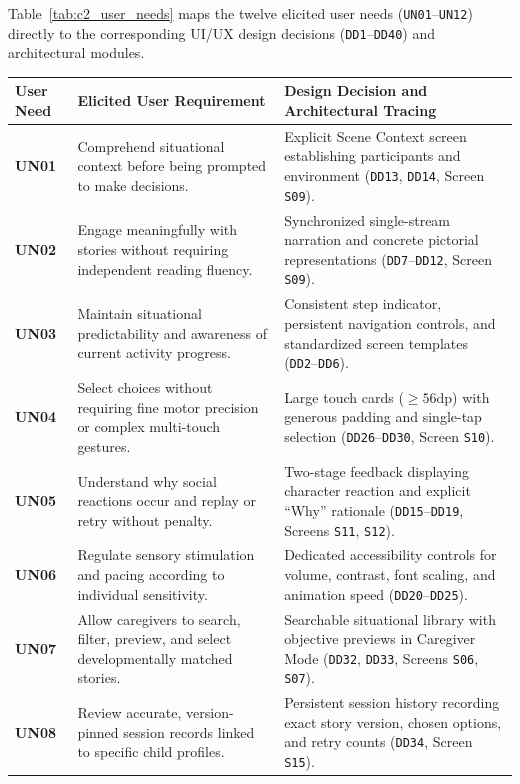 Table~\ref{tab:c2_user_needs} maps the twelve elicited user needs (\texttt{UN01}--\texttt{UN12}) directly to the corresponding UI/UX design decisions (\texttt{DD1}--\texttt{DD40}) and architectural modules.

\begin{xltabular}{\textwidth}{|p{1.8cm}|p{4.5cm}|X|}
\hline
\textbf{User Need} & \textbf{Elicited User Requirement} & \textbf{Design Decision and Architectural Tracing} \\ \hline
\endhead
\textbf{UN01} & Comprehend situational context before being prompted to make decisions. & Explicit Scene Context screen establishing participants and environment (\texttt{DD13}, \texttt{DD14}, Screen \texttt{S09}). \\ \hline
\textbf{UN02} & Engage meaningfully with stories without requiring independent reading fluency. & Synchronized single-stream narration and concrete pictorial representations (\texttt{DD7}--\texttt{DD12}, Screen \texttt{S09}). \\ \hline
\textbf{UN03} & Maintain situational predictability and awareness of current activity progress. & Consistent step indicator, persistent navigation controls, and standardized screen templates (\texttt{DD2}--\texttt{DD6}). \\ \hline
\textbf{UN04} & Select choices without requiring fine motor precision or complex multi-touch gestures. & Large touch cards ($\ge 56\text{dp}$) with generous padding and single-tap selection (\texttt{DD26}--\texttt{DD30}, Screen \texttt{S10}). \\ \hline
\textbf{UN05} & Understand why social reactions occur and replay or retry without penalty. & Two-stage feedback displaying character reaction and explicit ``Why'' rationale (\texttt{DD15}--\texttt{DD19}, Screens \texttt{S11}, \texttt{S12}). \\ \hline
\textbf{UN06} & Regulate sensory stimulation and pacing according to individual sensitivity. & Dedicated accessibility controls for volume, contrast, font scaling, and animation speed (\texttt{DD20}--\texttt{DD25}). \\ \hline
\textbf{UN07} & Allow caregivers to search, filter, preview, and select developmentally matched stories. & Searchable situational library with objective previews in Caregiver Mode (\texttt{DD32}, \texttt{DD33}, Screens \texttt{S06}, \texttt{S07}). \\ \hline
\textbf{UN08} & Review accurate, version-pinned session records linked to specific child profiles. & Persistent session history recording exact story version, chosen options, and retry counts (\texttt{DD34}, Screen \texttt{S15}). \\ \hline

\end{xltabular}
